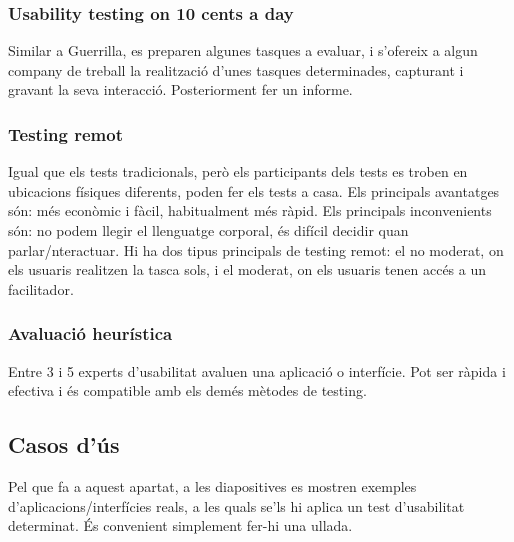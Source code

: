 \documentclass[12pt]{article}
\begin{document}
    \subsubsection{Usability testing on 10 cents a day}
    Similar a Guerrilla, es preparen algunes tasques a evaluar, i s'ofereix a algun company de treball la realització d'unes tasques determinades, capturant i gravant la
    seva interacció. Posteriorment fer un informe.
    \subsubsection{Testing remot}
    Igual que els tests tradicionals, però els participants dels tests es troben en ubicacions físiques diferents, poden fer els tests a casa. Els principals avantatges són: 
    més econòmic i fàcil, habitualment més ràpid. Els principals inconvenients són: no podem llegir el llenguatge corporal, és difícil decidir quan parlar/nteractuar.
    Hi ha dos tipus principals de testing remot: el no moderat, on els usuaris realitzen la tasca sols, i el moderat, on els usuaris tenen accés a un facilitador.
    \subsubsection{Avaluació heurística}
    Entre 3 i 5 experts d'usabilitat avaluen una aplicació o interfície. Pot ser ràpida i efectiva i és compatible amb els demés mètodes de testing.

    \subsection{Casos d'ús}
    Pel que fa a aquest apartat, a les diapositives es mostren exemples d'aplicacions/interfícies reals, a les quals se'ls hi aplica un test d'usabilitat determinat. És convenient simplement fer-hi
    una ullada.
\end{document}
